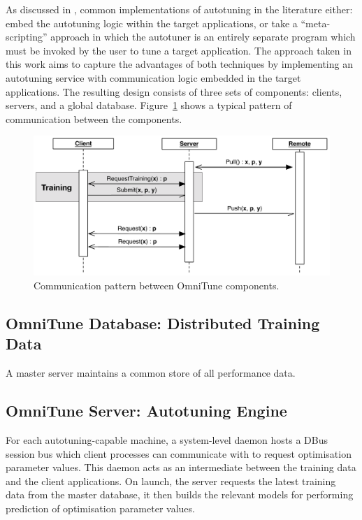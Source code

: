 As discussed in , common implementations of
autotuning in the literature either: embed the autotuning logic within
the target applications, or take a ``meta-scripting'' approach in
which the autotuner is an entirely separate program which must be
invoked by the user to tune a target application. The approach taken
in this work aims to capture the advantages of both techniques by
implementing an autotuning service with communication logic embedded
in the target applications. The resulting design consists of three
sets of components: clients, servers, and a global
database. Figure~\ref{fig:omnitune-comms} shows a typical pattern of
communication between the components.

\begin{figure}
\centering
\includegraphics[width=.8\textwidth]{img/omnitune-comms}
\caption{%
  Communication pattern between OmniTune components.%
}
\label{fig:omnitune-comms}
\end{figure}



\subsection{OmniTune Database: Distributed Training Data}

A master server maintains a common store of all performance
data. 


\subsection{OmniTune Server: Autotuning Engine}

For each autotuning-capable machine, a system-level daemon hosts a
DBus session bus which client processes can communicate with to
request optimisation parameter values. This daemon acts as an
intermediate between the training data and the client applications. On
launch, the server requests the latest training data from the master
database, it then builds the relevant models for performing prediction
of optimisation parameter values.

